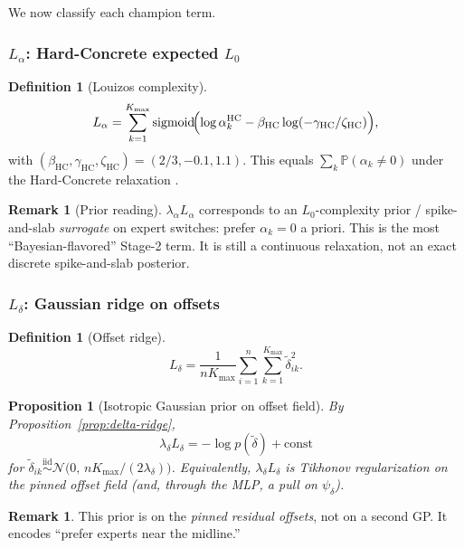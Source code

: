 \documentclass[11pt,a4paper]{article}
\theoremstyle{plain}
\newtheorem{proposition}[theorem]{Proposition}
\theoremstyle{definition}
\newtheorem{definition}[theorem]{Definition}
\newtheorem{remark}[theorem]{Remark}
\theoremstyle{remark}
\newcommand{\Ncal}{\mathcal{N}}
\newcommand{\sigmoid}{\operatorname{sigmoid}}
\newcommand{\Kmax}{K_{\max}}
\begin{document}
We now classify each champion term.

\subsubsection{\texorpdfstring{$L_\alpha$}{L\_alpha}: Hard-Concrete expected \texorpdfstring{$L_0$}{L0}}
\begin{definition}[Louizos complexity]
\[
  L_\alpha
  =
  \sum_{k=1}^{\Kmax}
  \sigmoid\!\Bigl(
    \log\alpha_k^{\mathrm{HC}}
    -
    \beta_{\mathrm{HC}}
    \log(-\gamma_{\mathrm{HC}}/\zeta_{\mathrm{HC}})
  \Bigr),
\]
with \((\beta_{\mathrm{HC}},\gamma_{\mathrm{HC}},\zeta_{\mathrm{HC}})=(2/3,-0.1,1.1)\).
This equals \(\sum_k\mathbb P(\alpha_k\neq 0)\) under the Hard-Concrete relaxation
\citep{Louizos2018}.
\end{definition}

\begin{remark}[Prior reading]
\(\lambda_\alpha L_\alpha\) corresponds to an \(L_0\)-complexity prior / spike-and-slab
\emph{surrogate} on expert switches: prefer \(\alpha_k=0\) a priori.
This is the most ``Bayesian-flavored'' Stage-2 term.
It is still a continuous relaxation, not an exact discrete spike-and-slab posterior.
\end{remark}

\subsubsection{\texorpdfstring{$L_\delta$}{L\_delta}: Gaussian ridge on offsets}
\begin{definition}[Offset ridge]
\[
  L_\delta
  =
  \frac{1}{n\Kmax}
  \sum_{i=1}^n
  \sum_{k=1}^{\Kmax}
  \tilde\delta_{ik}^{2}.
\]
\end{definition}

\begin{proposition}[Isotropic Gaussian prior on offset field]
\label{prop:delta-gauss-var}
By Proposition~\ref{prop:delta-ridge},
\[
  \lambda_\delta L_\delta
  =
  -\log p(\tilde\delta)+\mathrm{const}
\]
for
\(\tilde\delta_{ik}\stackrel{\mathrm{iid}}{\sim}
\Ncal\bigl(0,\,n\Kmax/(2\lambda_\delta)\bigr)\).
Equivalently, \(\lambda_\delta L_\delta\) is Tikhonov regularization on the pinned
offset field (and, through the MLP, a pull on \(\psi_\delta\)).
\end{proposition}

\begin{remark}
This prior is on the \emph{pinned residual offsets}, not on a second GP.
It encodes ``prefer experts near the midline.''
\end{remark}
\end{document}
